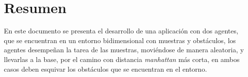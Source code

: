 \section{Resumen}
En este documento se presenta el desarrollo de una aplicación con dos agentes, que se encuentran en un entorno bidimensional con muestras y obstáculos, los agentes desempeñan la tarea de las muestras, moviéndose de manera aleatoria, y llevarlas a la base, por el camino con distancia \textit{manhattan} más corta, en ambos casos deben esquivar los obstáculos que se encuentran en el entorno. 